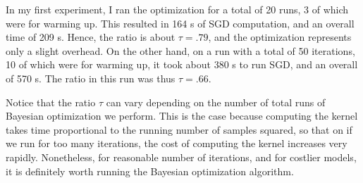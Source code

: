 \documentclass[10pt]{article}
\begin{document}
\begin{multicols}{2}
In my first experiment, I ran the optimization for a total of 20 runs, 3 of which were for warming up. This resulted in 164 s of SGD computation, and an overall time of 209 s. Hence, the ratio is about $\tau = .79$, and the optimization represents only a slight overhead. On the other hand, on a run with a total of 50 iterations, 10 of which were for warming up, it took about 380 s to run SGD, and an overall of 570 s. The ratio in this run was thus $\tau = .66$.

Notice that the ratio $\tau$ can vary depending on the number of total runs of Bayesian optimization we perform. This is the case because computing the kernel takes time proportional to the running number of samples squared, so that on if we run for too many iterations, the cost of computing the kernel increases very rapidly. Nonetheless, for reasonable number of iterations, and for costlier models, it is definitely worth running the Bayesian optimization algorithm.

\end{multicols}
\end{document}

